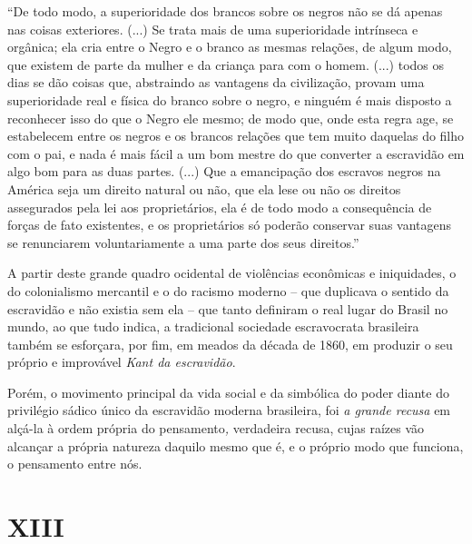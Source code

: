 ``De todo modo, a superioridade dos brancos sobre os negros não se dá
apenas nas coisas exteriores. (...) Se trata mais de uma superioridade
intrínseca e orgânica; ela cria entre o Negro e o branco as mesmas
relações, de algum modo, que existem de parte da mulher e da criança
para com o homem. (...) todos os dias se dão coisas que, abstraindo as
vantagens da civilização, provam uma superioridade real e física do
branco sobre o negro, e ninguém é mais disposto a reconhecer isso do que
o Negro ele mesmo; de modo que, onde esta regra age, se estabelecem
entre os negros e os brancos relações que tem muito daquelas do filho
com o pai, e nada é mais fácil a um bom mestre do que converter a
escravidão em algo bom para as duas partes. (...) Que a emancipação dos
escravos negros na América seja um direito natural ou não, que ela lese
ou não os direitos assegurados pela lei aos proprietários, ela é de todo
modo a consequência de forças de fato existentes, e os proprietários só
poderão conservar suas vantagens se renunciarem voluntariamente a uma
parte dos seus direitos.''

A partir deste grande quadro ocidental de violências econômicas e
iniquidades, o do colonialismo mercantil e o do racismo moderno -- que
duplicava o sentido da escravidão e não existia sem ela -- que tanto
definiram o real lugar do Brasil no mundo, ao que tudo indica, a
tradicional sociedade escravocrata brasileira também se esforçara, por
fim, em meados da década de 1860, em produzir o seu próprio e improvável
\emph{Kant da escravidão}.

Porém, o movimento principal da vida social e da simbólica do poder
diante do privilégio sádico único da escravidão moderna brasileira, foi
\emph{a grande recusa} em alçá-la à ordem própria do pensamento\emph{,}
verdadeira recusa, cujas raízes vão alcançar a própria natureza daquilo
mesmo que é, e o próprio modo que funciona, o pensamento entre nós.

\section{XIII}

